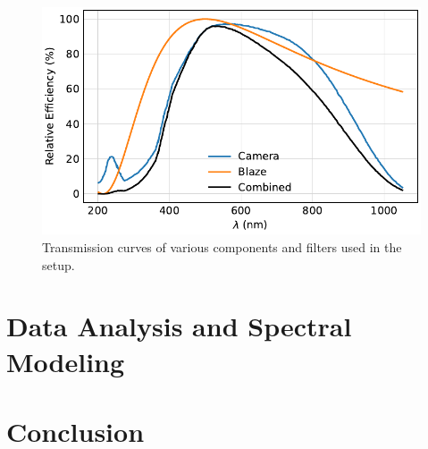 \documentclass[
	parskip=half,
	a4paper,
]{scrarticle}
\begin{document}
\begin{figure}
    \centering
    \includegraphics{../analysis/figures/expected.pdf}
    \caption{Transmission curves of various components and filters used in the setup.}
    \label{fig:transmission}
\end{figure}

\section{Data Analysis and Spectral Modeling}


\section{Conclusion}

\clearpage
\printbibliography
\end{document}
